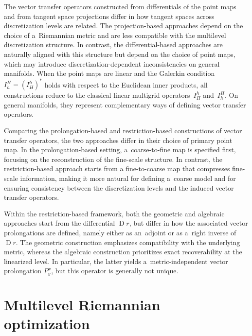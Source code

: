 \documentclass[11pt,reqno]{amsart}
\theoremstyle{plain}
\DeclareMathOperator{\Drm}{D}
\def\restr{r}
\begin{document}
	The vector transfer operators constructed from differentials of the point maps and from tangent space projections differ in how tangent spaces across discretization levels are related. The projection-based approaches depend on the choice of a~Riemannian metric and are less compatible with the multilevel discretization structure. In contrast, the differential-based approaches are naturally aligned with this structure but depend on the choice of point maps, which may introduce discretization-dependent inconsistencies on general manifolds. When the point maps are linear and the Galerkin condition $I_h^H = (I_H^h)^\ast$ holds with respect to the Euclidean inner products, all constructions reduce to the classical linear multigrid operators~$I_H^h$ and~$I_h^H$. On general manifolds, they represent complementary ways of defining vector transfer operators.
	
	Comparing the prolongation-based and restriction-based constructions of vector transfer operators, the two approaches differ in their choice of primary point map. In the prolongation-based setting, a~coarse-to-fine map is specified first, focusing on the reconstruction of the fine-scale structure. In contrast, the restriction-based approach starts from a fine-to-coarse map that compresses fine-scale information, making it more natural for defining a~coarse model and for ensuring consistency between the discretization levels and the induced vector transfer operators.
	
	Within the restriction-based framework, both the geometric and algebraic approaches start from the differential $\Drm \restr$, but differ in how the associated vector prolongations are defined, namely either as an~adjoint or as a~right inverse of~$\Drm \restr$. The geometric construction emphasizes compatibility with the underlying metric, whereas the algebraic construction prioritizes exact recoverability at the linearized level. In particular, the latter yields a~metric-independent vector prolongation $P_y^x$, but this operator is generally not unique. 
	
	
	\section{Multilevel Riemannian optimization}
	\label{sec:geometric-multilevel}
	
\end{document}
